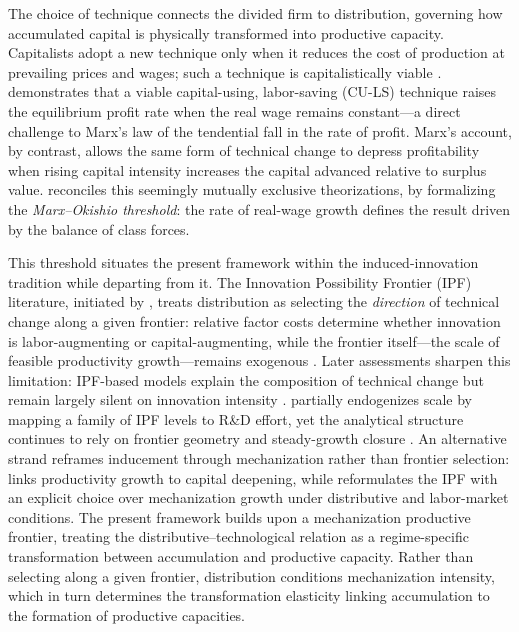 The choice of technique connects the divided firm to
distribution, governing how accumulated capital is physically
transformed into productive capacity. Capitalists adopt a new
technique only when it reduces the cost of production at
prevailing prices and wages; such a technique is capitalistically
viable \citep{Okishio1961}. \citet{Okishio1961} demonstrates
that a viable capital-using, labor-saving (CU-LS) technique
raises the equilibrium profit rate when the real wage remains
constant---a direct challenge to Marx's law of the tendential
fall in the rate of profit. Marx's account, by contrast, allows
the same form of technical change to depress profitability when
rising capital intensity increases the capital advanced relative
to surplus value. \citet{Basu2022} reconciles this seemingly mutually exclusive 
theorizations, by formalizing the \textit{Marx--Okishio threshold}: 
the rate of real-wage growth defines the result driven by
the balance of class forces. 

This threshold situates the present framework within the
induced-innovation tradition while departing from it. The
Innovation Possibility Frontier (IPF) literature, initiated by
\citet{Kennedy1964}, treats distribution as selecting the
\textit{direction} of technical change along a given frontier:
relative factor costs determine whether innovation is
labor-augmenting or capital-augmenting, while the frontier
itself---the scale of feasible productivity growth---remains
exogenous \citep{Julius2005, Tavani2012}. Later assessments
sharpen this limitation: IPF-based models explain the
composition of technical change but remain largely silent on
innovation intensity \citep{TavaniZamparelli2018}.
\citet{Zamparelli2024a} partially endogenizes scale by mapping
a family of IPF levels to R\&D effort, yet the analytical
structure continues to rely on frontier geometry and
steady-growth closure \citep{Zamparelli2024b}. An alternative
strand reframes inducement through mechanization rather than
frontier selection: \citet{Kaldor1957} links productivity
growth to capital deepening, while
\citet{CajasGuajirro2024} reformulates the IPF with an explicit
choice over mechanization growth under distributive and
labor-market conditions. The present framework builds upon a 
mechanization productive frontier,  treating the distributive--technological 
relation as a regime-specific transformation between accumulation and
productive capacity. Rather than selecting along a given
frontier, distribution conditions mechanization intensity,
which in turn determines the transformation elasticity linking
accumulation to the formation of productive capacities. 

